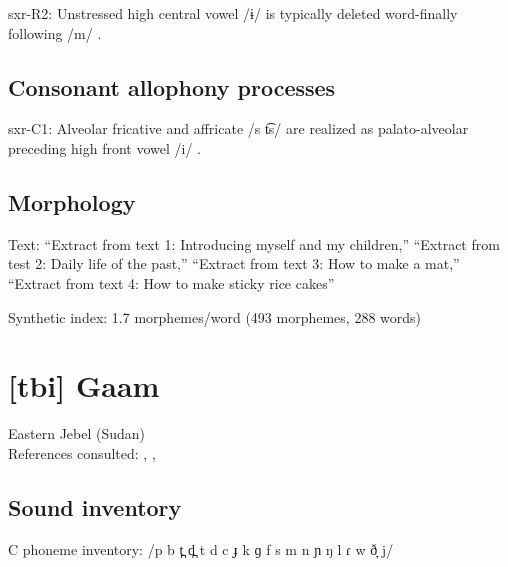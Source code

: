 {\begin{appendixdesc}
\item[sxr-R2:] Unstressed high central vowel /ɨ/ is typically deleted word-finally following /m/ \citep[39]{Pan2012}.
\end{appendixdesc}
\subsection*{Consonant allophony processes}
\begin{appendixdesc}

\item[sxr-C1:] Alveolar fricative and affricate /s t͡s/ are realized as palato-alveolar preceding high front vowel /i/ \citep[28]{Pan2012}.
\end{appendixdesc}
\subsection*{Morphology}

\begin{appendixdesc}

\item[Text:] “Extract from text 1: Introducing myself and my children,” “Extract from test 2: Daily life of the past,” “Extract from text 3: How to make a mat,” “Extract from text 4: How to make sticky rice cakes” \citep[365--372]{Pan2012}

\item[Synthetic index:] 1.7 morphemes/word (493 morphemes, 288 words)
\end{appendixdesc}
\section*{[tbi] Gaam}   %
Eastern Jebel (Sudan)\medskip\\
References consulted: \citet{Bender1983}, \citet{Crewe1975}, \citet{Stirtz2011}

\subsection*{Sound inventory}
\begin{appendixdesc}

\item[C phoneme inventory:] /p b t̪ d̪ t d c ɟ k ɡ f s m n ɲ ŋ l ɾ w ð̞ j/


\end{appendixdesc}}
